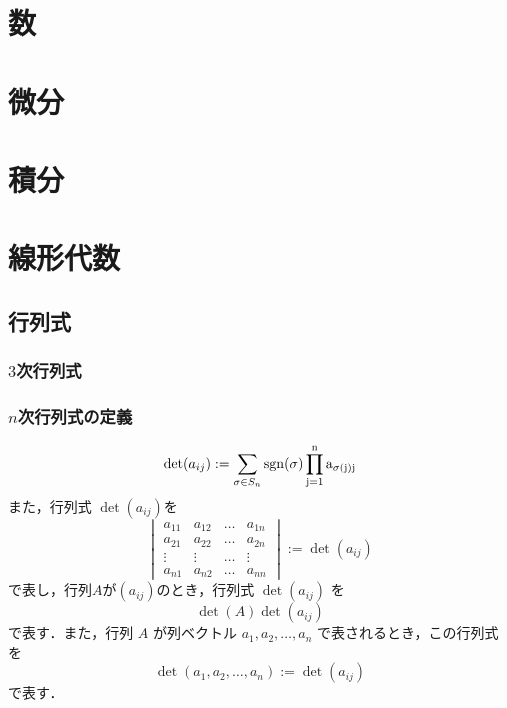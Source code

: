 \documentclass[autodetect-engine,dvipdfmx-if-dvi,ja=standard,a4paper,12pt]{bxjsbook}
\begin{document}
	\tableofcontents
	\part{数}
	\part{微分}
	\part{積分}
	\part{線形代数}
		\chapter{行列式}
			\section{$3$次行列式}
			\section{$n$次行列式の定義}
					\begin{equation}
						\det(a_{i j}) := \sum_{\sigma \in S_n} \rm{sgn}(\sigma) \prod_{j=1}^{n} a_{\sigma(j) j}
					\end{equation}
					また，行列式 $\det(a_{i j})$を
					\begin{equation}
						\begin{vmatrix}
							a_{1 1} & a_{1 2} & \dots & a_{1 n} \\
							a_{2 1} & a_{2 2} & \dots & a_{2 n} \\
							\vdots & \vdots & \dots & \vdots \\
							a_{n 1} & a_{n 2} & \dots & a_{n n}
						\end{vmatrix}
						:= \det(a_{i j})
					\end{equation}
					で表し，行列$A$が$(a_{i j})$のとき，行列式 $\det(a_{i j})$ を
					\begin{equation}
						\det(A)  \det(a_{i j})
					\end{equation}
					で表す．また，行列 $A$ が列ベクトル $a_1, a_2, \dots, a_n$ で表されるとき，この行列式を
					\begin{equation}
						\det(a_1,a_2, \dots, a_n) := \det(a_{i j})
					\end{equation}
					で表す．
\end{document}
